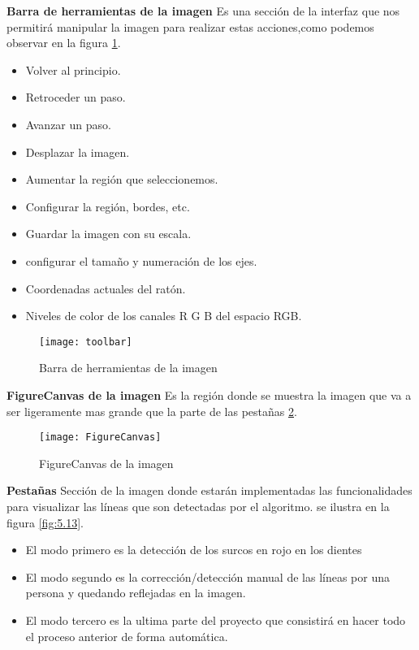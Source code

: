 \textbf{Barra de herramientas de la imagen}
Es una sección de la interfaz que nos permitirá manipular la imagen para realizar estas acciones,como podemos observar en la figura \ref{fig:5.11}.

\begin{itemize}
\item Volver al principio. 
\item Retroceder un paso.
\item Avanzar un paso.
\item Desplazar la imagen.
\item Aumentar la región que seleccionemos.
\item Configurar la región, bordes, etc.
\item Guardar la imagen con su escala.
\item configurar el tamaño y numeración de los ejes.
\item Coordenadas actuales del ratón.
\item Niveles de color de los canales R G B del espacio RGB.
\end{itemize}

\begin{figure}[h]
\centering
\texttt{[image: toolbar]}
\caption{Barra de herramientas de la imagen}\label{fig:5.11}
\end{figure}


\textbf{FigureCanvas de la imagen}
Es la región donde se muestra la imagen que va a ser ligeramente mas grande que la parte de las pestañas \ref{fig:5.12}.
\begin{figure}[h]
\centering
\texttt{[image: FigureCanvas]}
\caption{FigureCanvas de la imagen}
\label{fig:5.12}
\end{figure}


\textbf{Pestañas}
Sección de la imagen donde estarán implementadas las funcionalidades para visualizar las líneas que son detectadas por el algoritmo. se ilustra en la figura \ref{fig:5.13}.
\begin{itemize}
\item El modo primero es la detección de los surcos en rojo en los dientes 
\item El modo segundo es la corrección/detección manual de las líneas por una persona y quedando reflejadas en la imagen.
\item El modo tercero es la ultima parte del proyecto que consistirá en hacer todo el proceso anterior de forma automática.
\end{itemize}

